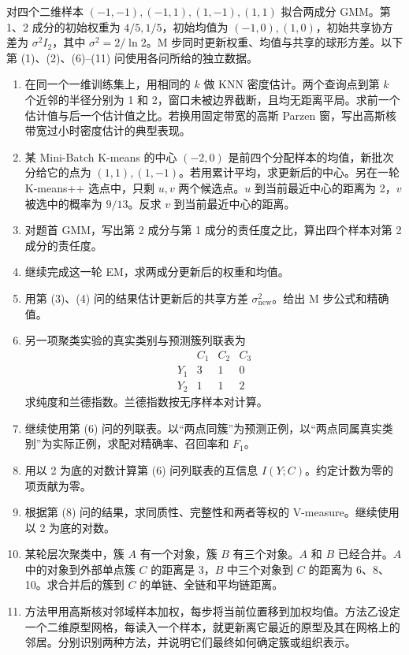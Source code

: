 对四个二维样本 $(-1,-1),(-1,1),(1,-1),(1,1)$ 拟合两成分 GMM。第 1、2 成分的初始权重为 $4/5,1/5$，初始均值为 $(-1,0),(1,0)$，初始共享协方差为 $\sigma^2I_2$，其中 $\sigma^2=2/\ln 2$。M 步同时更新权重、均值与共享的球形方差。以下第 (1)、(2)、(6)–(11) 问使用各问所给的独立数据。
\begin{enumerate}[label=(\arabic*)]
\item 在同一个一维训练集上，用相同的 $k$ 做 KNN 密度估计。两个查询点到第 $k$ 个近邻的半径分别为 1 和 2，窗口未被边界截断，且均无距离平局。求前一个估计值与后一个估计值之比。若换用固定带宽的高斯 Parzen 窗，写出高斯核带宽过小时密度估计的典型表现。
\item 某 Mini-Batch K-means 的中心 $(-2,0)$ 是前四个分配样本的均值，新批次分给它的点为 $(1,1),(1,-1)$。若用累计平均，求更新后的中心。另在一轮 K-means++ 选点中，只剩 $u,v$ 两个候选点。$u$ 到当前最近中心的距离为 2，$v$ 被选中的概率为 $9/13$。反求 $v$ 到当前最近中心的距离。
\item 对题首 GMM，写出第 2 成分与第 1 成分的责任度之比，算出四个样本对第 2 成分的责任度。
\item 继续完成这一轮 EM，求两成分更新后的权重和均值。
\item 用第 (3)、(4) 问的结果估计更新后的共享方差 $\sigma_{\mathrm{new}}^2$。给出 M 步公式和精确值。
\item 另一项聚类实验的真实类别与预测簇列联表为
\[
\begin{array}{c|rrr}
 &C_1&C_2&C_3\\\hline
Y_1&3&1&0\\
Y_2&1&1&2
\end{array}
\]
求纯度和兰德指数。兰德指数按无序样本对计算。
\item 继续使用第 (6) 问的列联表。以“两点同簇”为预测正例，以“两点同属真实类别”为实际正例，求配对精确率、召回率和 $F_1$。
\item 用以 2 为底的对数计算第 (6) 问列联表的互信息 $I(Y;C)$。约定计数为零的项贡献为零。
\item 根据第 (8) 问的结果，求同质性、完整性和两者等权的 V-measure。继续使用以 2 为底的对数。
\item 某轮层次聚类中，簇 $A$ 有一个对象，簇 $B$ 有三个对象。$A$ 和 $B$ 已经合并。$A$ 中的对象到外部单点簇 $C$ 的距离是 3，$B$ 中三个对象到 $C$ 的距离为 6、8、10。求合并后的簇到 $C$ 的单链、全链和平均链距离。
\item 方法甲用高斯核对邻域样本加权，每步将当前位置移到加权均值。方法乙设定一个二维原型网格，每读入一个样本，就更新离它最近的原型及其在网格上的邻居。分别识别两种方法，并说明它们最终如何确定簇或组织表示。
\end{enumerate}

